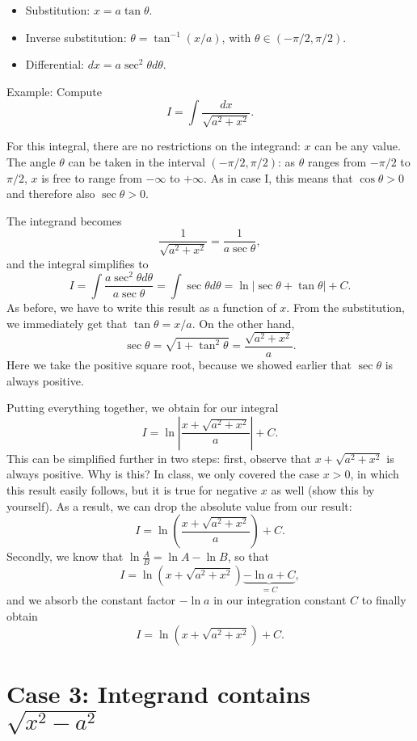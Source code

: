 \documentclass{article}
\begin{document}
\begin{itemize}
\item Substitution: $x = a \tan \theta$.
\item Inverse substitution: $\theta = \tan^{-1}(x/a)$, with $\theta \in (-\pi/2, \pi/2)$.
\item Differential: $dx = a \sec^2 \theta d\theta$.
\end{itemize}

Example: Compute
\[
    I = \int\frac{dx}{\sqrt{a^2 + x^2}}.
\]

For this integral, there are no restrictions on the integrand: $x$ can be any value. The angle $\theta$ can be taken in the interval $(-\pi/2, \pi/2)$: as $\theta$ ranges from $-\pi/2$ to $\pi/2$, $x$ is free to range from $-\infty$ to $+\infty$. As in case I, this means that $\cos \theta > 0$ and therefore also $\sec \theta > 0$.

The integrand becomes
\[
  \frac{1}{\sqrt{a^2 + x^2}} = \frac{1}{a \sec \theta},
\]
and the integral simplifies to
\[
  I = \int \frac{a \sec^2 \theta d\theta}{a \sec \theta} = \int \sec \theta d \theta = \ln \left| \sec \theta + \tan \theta \right| + C.
\]
As before, we have to write this result as a function of $x$. From the substitution, we immediately get that $\tan \theta = x/a$. On the other hand,
\[
  \sec \theta = \sqrt{1 + \tan^2 \theta} = \frac{\sqrt{a^2 + x^2}}{a}.
\]
Here we take the positive square root, because we showed earlier that $\sec \theta$ is always positive.

Putting everything together, we obtain for our integral
\[
  I  = \ln \left| \frac{x + \sqrt{a^2 + x^2}}{a} \right| + C.
\]
This can be simplified further in two steps: first, observe that $x + \sqrt{a^2 + x^2}$ is always positive. Why is this? In class, we only covered the case $x > 0$, in which this result easily follows, but it is true for negative $x$ as well (show this by yourself). As a result, we can drop the absolute value from our result:
\[
  I  = \ln \left( \frac{x + \sqrt{a^2 + x^2}}{a} \right) + C.
\]
Secondly, we know that $\ln \frac{A}{B} = \ln A - \ln B$, so that
\[
  I  = \ln \left( x + \sqrt{a^2 + x^2} \right) \underbrace{- \ln a + C}_{= C},
\]
and we absorb the constant factor $- \ln a$ in our integration constant $C$ to finally obtain
\[
  I  = \ln \left( x + \sqrt{a^2 + x^2} \right) + C.
\]

\section*{Case 3: Integrand contains $\sqrt{x^2 - a^2}$}
\end{document}
